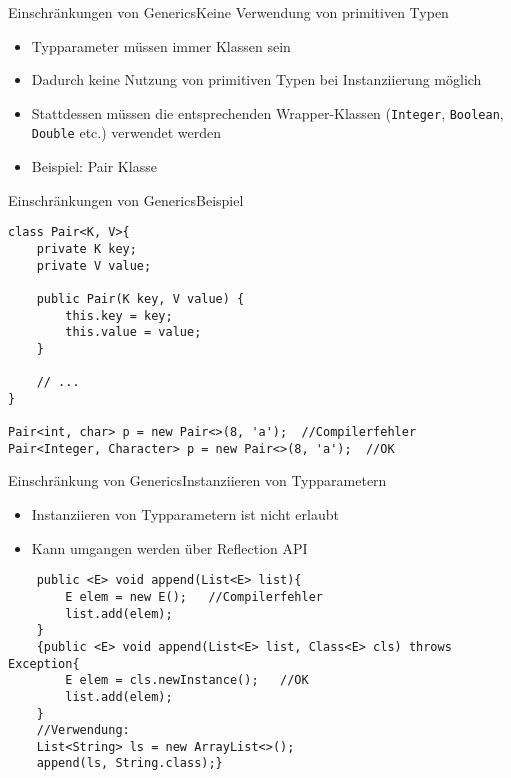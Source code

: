 \begin{frame}{Einschränkungen von Generics}{Keine Verwendung von primitiven Typen}
    \begin{itemize}
        \item Typparameter müssen immer Klassen sein
        \item Dadurch keine Nutzung von primitiven Typen bei Instanziierung möglich
        \item Stattdessen müssen die entsprechenden Wrapper-Klassen (\texttt{Integer}, \texttt{Boolean}, \texttt{Double} etc.) verwendet werden
        \item Beispiel: Pair Klasse
    \end{itemize}
\end{frame}

\begin{frame}[fragile]{Einschränkungen von Generics}{Beispiel}
\lstset{style=java}
\begin{lstlisting}
class Pair<K, V>{
    private K key;
    private V value;

    public Pair(K key, V value) {
        this.key = key;
        this.value = value;
    }

    // ...
}

Pair<int, char> p = new Pair<>(8, 'a');  //Compilerfehler
Pair<Integer, Character> p = new Pair<>(8, 'a');  //OK
\end{lstlisting}
\end{frame}

\begin{frame}[fragile]{Einschränkung von Generics}{Instanziieren von Typparametern}
    \begin{itemize}
        \item Instanziieren von Typparametern ist nicht erlaubt
        \item Kann umgangen werden über Reflection API
    \end{itemize}
    \lstset{style=java}
    \begin{lstlisting}
    public <E> void append(List<E> list){
        E elem = new E();   //Compilerfehler
        list.add(elem);
    }
    {public <E> void append(List<E> list, Class<E> cls) throws Exception{
        E elem = cls.newInstance();   //OK
        list.add(elem);
    }
    //Verwendung:
    List<String> ls = new ArrayList<>();
    append(ls, String.class);}
    \end{lstlisting}
\end{frame}

